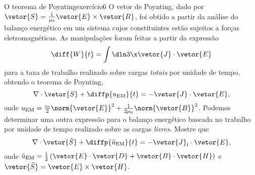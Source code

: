 \begin{exercício}{O teorema de Poynting}{exercício6}
    O vetor de Poynting, dado por \(\vetor{S} = \frac1{\mu_0}\vetor{E}\times\vetor{B}\), foi obtido a partir da análise do balanço energético em um sistema cujos constituintes estão sujeitos a forças eletromagnéticas. As manipulações foram feitas a partir da expressão
    \begin{equation*}
        \diff{W}{t} = \int \dln3\x \vetor{J} \cdot \vetor{E}
    \end{equation*}
    para a taxa de trabalho realizado sobre cargas \emph{totais} por unidade de tempo, obtendo o teorema de Poynting,
    \begin{equation*}
        \nabla \cdot \vetor{S} + \diffp{u_{\mathrm{EM}}}{t} = - \vetor{J} \cdot \vetor{E},
    \end{equation*}
    onde \(u_{\mathrm{EM}} = \frac{\epsilon_0}2\norm{\vetor{E}}^2 + \frac1{2\mu_0}\norm{\vetor{B}}^2\). Podemos determinar uma outra expressão para o balanço energético baseada no trabalho por unidade de tempo realizado sobre as cargas \emph{livres}. Mostre que
    \begin{equation*}
        \nabla \cdot \vetor{\tilde{S}} + \diffp{\tilde{u}_{\mathrm{EM}}}{t} = - \vetor{J}_l \cdot \vetor{E},
    \end{equation*}
    onde \(\tilde{u}_{\mathrm{EM}} = \frac12 \left(\vetor{E} \cdot \vetor{D} + \vetor{B} \cdot \vetor{H}\right)\) e \(\vetor{\tilde{S}} = \vetor{E} \times \vetor{H}\).


\end{exercício}
